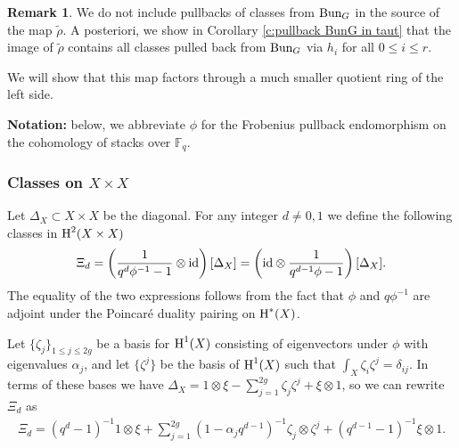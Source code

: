 \documentclass[reqno]{amsart}
\numberwithin{equation}{subsection}
\theoremstyle{definition}
\newtheorem{remark}[subsubsection]{Remark}
\def\FF{\mathbb{F}}
\newcommand\cO{\mathcal{O}}
\newcommand{\Bun}{\textup{Bun}}
\newcommand\id{\textup{id}}
\renewcommand{\j}[1]{\langle{#1}\rangle}
\newcommand{\wt}[1]{\widetilde{#1}}
\newcommand\ot{\otimes}
\newcommand{\cohog}[2]{\textup{H}^{#1}({#2})}     %
\renewcommand\a\alpha
\renewcommand\b\beta
\renewcommand\d\delta
\newcommand\D\Delta
\renewcommand\r\rho
\newcommand{\z}{\zeta}
\begin{document}
\begin{remark}
    We do not include pullbacks of classes from $\Bun_G$ in the source of the map $\wt\r$. A posteriori, we show in Corollary \ref{c:pullback BunG in taut} that the image of $\wt\r$ contains all classes pulled back from $\Bun_G$ via $h_i$ for all $0\le i\le r$.
\end{remark}


We will show that this map factors through a much smaller quotient ring of the left side.

{\bf Notation:} below, we abbreviate $\phi$ for the Frobenius pullback endomorphism on the cohomology of stacks over $\FF_q$.




\subsubsection{Classes on $X\times X$}

Let $\D_{X}\subset X\times X$ be the diagonal. For any integer $d\ne 0,1$ we define the following classes in $\cohog{2}{X\times X}$
\begin{eqnarray*}
    \Xi_d=\left(\frac{1}{q^d\phi^{-1}-1}\ot \id\right)[\D_X]=\left(\id\ot\frac{1}{q^{d-1}\phi-1}\right)[\D_X].
\end{eqnarray*}
The equality of the two expressions follows from the fact that $\phi$ and $q\phi^{-1}$ are adjoint under the Poincar\'e duality pairing on $\cohog{*}{X}$.

Let $\{\z_j\}_{1\le j\le 2g}$ be a basis for $\cohog{1}{X}$ consisting of eigenvectors under $\phi$ with eigenvalues $\a_j$, and let $\{\z^j\}$ be the basis of $\cohog{1}{X}$ such that $\int_X\z_i\z^j=\d_{ij}$. In terms of these bases we have $\D_X = 1 \otimes \xi  - \sum_{j=1}^{2g} \z_j \z^j + \xi \otimes 1$, so we can rewrite $\Xi_d$ as
\begin{eqnarray*}
    \Xi_d=(q^d-1)^{-1}1\ot \xi+\sum_{j=1}^{2g}(1-\a_jq^{d-1})^{-1}\z_j\ot \z^j+(q^{d-1}-1)^{-1}\xi\ot 1.
\end{eqnarray*}
\end{document}
